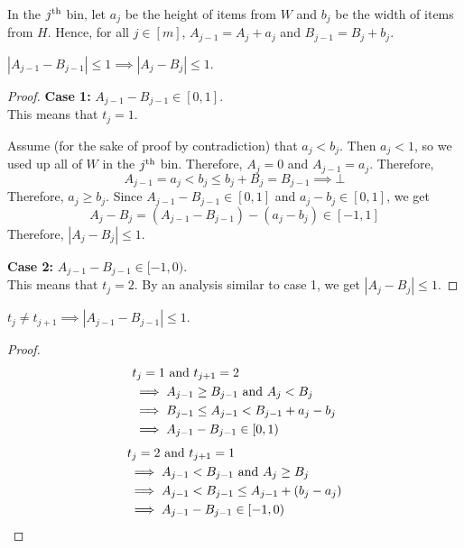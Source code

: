 In the $j^{\textrm{th}}$ bin, let $a_j$ be the height of items from $W$
and $b_j$ be the width of items from $H$.
Hence, for all $j \in [m]$,
$A_{j-1} = A_j + a_j$ and $B_{j-1} = B_j + b_j$.

\begin{lemma}
\label{thm:diff-capture}
$|A_{j-1} - B_{j-1}| \le 1 \implies |A_j - B_j| \le 1$.
\end{lemma}
\begin{proof}
\textbf{Case 1:} $A_{j-1} - B_{j-1} \in [0, 1]$.
\\ This means that $t_j = 1$.

Assume (for the sake of proof by contradiction) that $a_j < b_j$.
Then $a_j < 1$, so we used up all of $W$ in the $j^{\textrm{th}}$ bin.
Therefore, $A_j = 0$ and $A_{j-1} = a_j$. Therefore,
\[ A_{j-1} = a_j < b_j \le b_j + B_j = B_{j-1} \implies \bot \]
Therefore, $a_j \ge b_j$. Since $A_{j-1} - B_{j-1} \in [0, 1]$
and $a_j - b_j \in [0, 1]$, we get
\[ A_j - B_j = (A_{j-1} - B_{j-1}) - (a_j - b_j) \in [-1, 1] \]
Therefore, $|A_j - B_j| \le 1$.

\textbf{Case 2:} $A_{j-1} - B_{j-1} \in [-1, 0)$.
\\ This means that $t_j = 2$.
By an analysis similar to case 1, we get $|A_j - B_j| \le 1$.
\end{proof}

\begin{lemma}
\label{thm:tdiff-implies-adiff}
$t_j \neq t_{j+1} \implies |A_{j-1} - B_{j-1}| \le 1$.
\end{lemma}
\begin{proof}
\begin{align*}
& t_j = 1 \textrm{ and } t_{j+1} = 2
\\ &\implies A_{j-1} \ge B_{j-1} \textrm{ and } A_j < B_j
\\ &\implies B_{j-1} \le A_{j-1} < B_{j-1} + a_j - b_j
\\ &\implies A_{j-1} - B_{j-1} \in [0, 1)
\end{align*}
\begin{align*}
& t_j = 2 \textrm{ and } t_{j+1} = 1
\\ &\implies A_{j-1} < B_{j-1} \textrm{ and } A_j \ge B_j
\\ &\implies A_{j-1} < B_{j-1} \le A_{j-1} + (b_j - a_j)
\\ &\implies A_{j-1} - B_{j-1} \in [-1, 0)
\qedhere \end{align*}
\end{proof}

